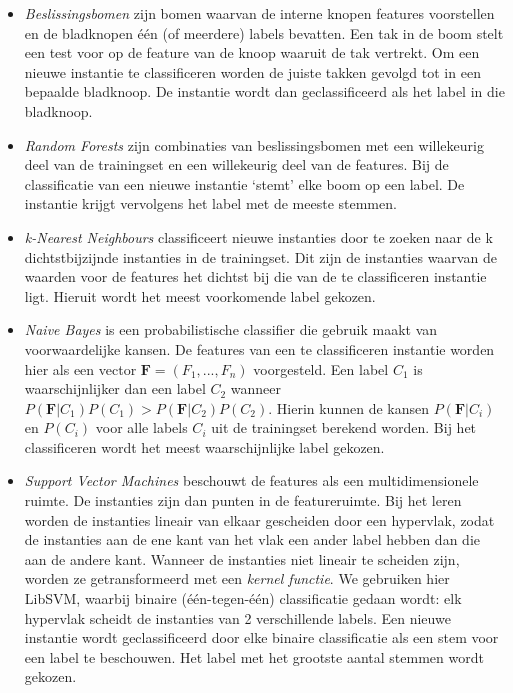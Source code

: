 \documentclass{article}
\begin{document}
\begin{itemize}
\item \textit{Beslissingsbomen} zijn bomen waarvan de interne knopen features voorstellen en de bladknopen \'e\'en (of meerdere) labels bevatten. Een tak in de boom stelt een test voor op de feature van de knoop waaruit de tak vertrekt. Om een nieuwe instantie te classificeren worden de juiste takken gevolgd tot in een bepaalde bladknoop. De instantie wordt dan geclassificeerd als het label in die bladknoop.
\item \textit{Random Forests} zijn combinaties van beslissingsbomen met een willekeurig deel van de trainingset en een willekeurig deel van de features. Bij de classificatie van een nieuwe instantie `stemt' elke boom op een label. De instantie krijgt vervolgens het label met de meeste stemmen.
\item \textit{k-Nearest Neighbours} classificeert nieuwe instanties door te zoeken naar de k dichtstbijzijnde instanties in de trainingset. Dit zijn de instanties waarvan de waarden voor de features het dichtst bij die van de te classificeren instantie ligt. Hieruit wordt het meest voorkomende label gekozen.
\item \textit{Naive Bayes} is een probabilistische classifier die gebruik maakt van voorwaardelijke kansen. De features van een te classificeren instantie worden hier als een vector $\mathbf{F} = (F_1, ..., F_n)$ voorgesteld. Een label $C_1$ is waarschijnlijker dan een label $C_2$ wanneer $P(\mathbf{F}|C_1) P(C_1) > P(\mathbf{F}|C_2) P(C_2)$. Hierin kunnen de kansen $P(\mathbf{F}|C_i)$ en $P(C_i)$ voor alle labels $C_i$ uit de trainingset berekend worden. Bij het classificeren wordt het meest waarschijnlijke label gekozen.
\item \textit{Support Vector Machines} beschouwt de features als een multidimensionele ruimte. De instanties zijn dan punten in de featureruimte. Bij het leren worden de instanties lineair van elkaar gescheiden door een hypervlak, zodat de instanties aan de ene kant van het vlak een ander label hebben dan die aan de andere kant. Wanneer de instanties niet lineair te scheiden zijn, worden ze getransformeerd met een \textit{kernel functie}. We gebruiken hier LibSVM, %
waarbij binaire (\'e\'en-tegen-\'e\'en) classificatie gedaan wordt: elk hypervlak scheidt de instanties van 2 verschillende labels. Een nieuwe instantie wordt geclassificeerd door elke binaire classificatie als een stem voor een label te beschouwen. Het label met het grootste aantal stemmen wordt gekozen.
\end{itemize}
\end{document}
